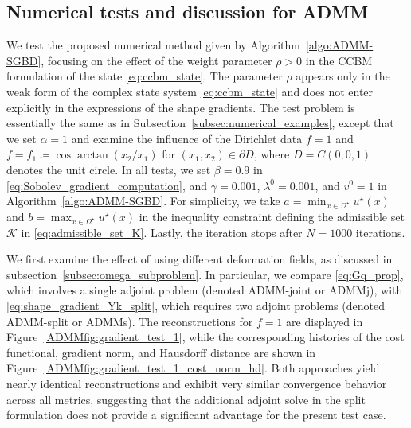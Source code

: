 \documentclass[a4paper,11pt]{article}
\begin{document}



\subsection{Numerical tests and discussion for ADMM}
\label{subsec:numerical_examples_ADMM} 
We test the proposed numerical method given by Algorithm~\ref{algo:ADMM-SGBD}, focusing on the effect of the weight parameter $\rho > 0$ in the CCBM formulation of the state \eqref{eq:ccbm_state}. 
The parameter $\rho$ appears only in the weak form of the complex state system \eqref{eq:ccbm_state} and does not enter explicitly in the expressions of the shape gradients. 
The test problem is essentially the same as in Subsection~\ref{subsec:numerical_examples}, except that we set $\alpha = 1$ and examine the influence of the Dirichlet data $f = 1$ and $f = f_{1} \coloneqq  \cos{\arctan(x_{2}/x_{1})}$ for $(x_{1}, x_{2}) \in \partial D$, where $D = C(0,0,1)$ denotes the unit circle.
In all tests, we set $\beta = 0.9$ in \eqref{eq:Sobolev_gradient_computation}, and $\gamma = 0.001$, $\lambda^{0} = 0.001$, and $v^{0} = 1$ in Algorithm~\ref{algo:ADMM-SGBD}.
For simplicity, we take $a = \min_{x \in \varOmega^{\star}} u^{\star}(x)$ and $b = \max_{x \in \varOmega^{\star}} u^{\star}(x)$ in the inequality constraint defining the admissible set $\mathcal{K}$ in \eqref{eq:admissible_set_K}.
Lastly, the iteration stops after $N = 1000$ iterations.

We first examine the effect of using different deformation fields, as discussed in subsection~\ref{subsec:omega_subproblem}. 
In particular, we compare \eqref{eq:Gq_prop}, which involves a single adjoint problem (denoted ADMM-joint or ADMMj), with \eqref{eq:shape_gradient_Yk_split}, which requires two adjoint problems (denoted ADMM-split or ADMMs). 
The reconstructions for $f=1$ are displayed in Figure~\ref{ADMMfig:gradient_test_1}, while the corresponding histories of the cost functional, gradient norm, and Hausdorff distance are shown in Figure~\ref{ADMMfig:gradient_test_1_cost_norm_hd}. 
Both approaches yield nearly identical reconstructions and exhibit very similar convergence behavior across all metrics, suggesting that the additional adjoint solve in the split formulation does not provide a significant advantage for the present test case.
\end{document}
